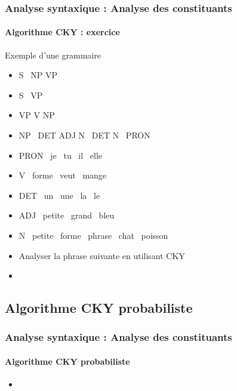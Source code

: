 \documentclass[xcolor=table]{beamer}
\begin{document}
\begin{frame}
\frametitle{Analyse syntaxique : Analyse des constituants}
\framesubtitle{Algorithme CKY : exercice}

\vspace{-6pt}
\begin{exampleblock}{Exemple d'une grammaire}
	\begin{itemize}
		\item S \textrightarrow\ NP VP 
		\item S \textrightarrow\ VP 
		\item VP \textrightarrow V NP
		\item NP \textrightarrow\ DET ADJ N \textbar\ DET N \textbar\ PRON 
		\item PRON \textrightarrow\ je \textbar\ tu \textbar\ il \textbar\ elle
		\item V \textrightarrow\ forme \textbar\ veut \textbar\ mange 
		\item DET \textrightarrow\ un \textbar\ une \textbar\ la \textbar\ le
		\item ADJ \textrightarrow\ petite \textbar\ grand \textbar\ bleu 
		\item N \textrightarrow\ petite \textbar\ forme \textbar\ phrase \textbar\ chat \textbar\ poisson
	\end{itemize}
\end{exampleblock}\vspace{-6pt}

\begin{itemize}
	\item Analyser la phrase suivante en utilisant CKY 
	\item {}
\end{itemize}

\end{frame}

\subsection{Algorithme CKY probabiliste}

\begin{frame}
\frametitle{Analyse syntaxique : Analyse des constituants}
\framesubtitle{Algorithme CKY probabiliste}

\begin{itemize}
	\item 
\end{itemize}

\end{frame}
\end{document}
